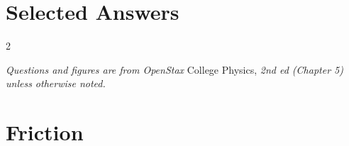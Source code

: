 \documentclass[10pt]{exam}
\def\theanswers{\theendnotes}
\begin{document}
  \section*{Selected Answers}

  \renewcommand{\enotesize}{\normalsize}
  \renewcommand{\enoteformat}{%
    \leftskip=1.8em
    \makebox[0pt][r]{\theenmark. }%
  }

  \hfill

  \begin{multicols}{2}
    \theanswers
  \end{multicols}



\pagebreak

\noindent
\textit{Questions and figures are from OpenStax} College Physics, \textit{2nd ed (Chapter 5) unless otherwise noted.}

\section*{Friction}
\end{document}
